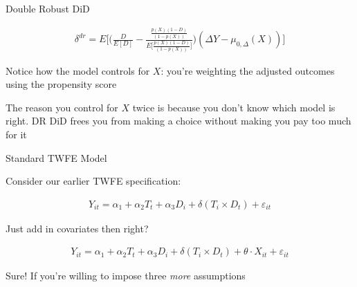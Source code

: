 \documentclass{beamer}
\begin{document}
\begin{frame}{Double Robust DiD}

\begin{eqnarray*}
\delta^{dr} = E \bigg [ \bigg ( \frac{D}{E[D]} -\frac{ \frac{p(X)(1-D)}{(1-p(X))} }{E \bigg [\frac{p(X)(1-D)}{(1-p(X))} \bigg ]} \bigg  )( \Delta Y - \mu_{0,\Delta}(X)) \bigg ]
\end{eqnarray*}

Notice how the model controls for $X$: you're weighting the adjusted outcomes using the propensity score

\bigskip

The reason you control for $X$ twice is because you don't know which model is right.  DR DiD frees you from making a choice without making you pay too much for it


\end{frame}


\begin{frame}{Standard TWFE Model}

Consider our earlier TWFE specification:

\begin{eqnarray*}
Y_{it} = \alpha_1  + \alpha_2 T_t + \alpha_3 D_i +  \delta (T_i \times D_t)  + \varepsilon_{it}
\end{eqnarray*}

\bigskip

Just add in covariates then right?

\begin{eqnarray*}
Y_{it} = \alpha_1  + \alpha_2 T_t + \alpha_3 D_i  + \delta (T_i \times D_t) + \theta \cdot X_{it} + \varepsilon_{it}
\end{eqnarray*}

Sure! If you're willing to impose three \emph{more} assumptions

\end{frame}
\end{document}
